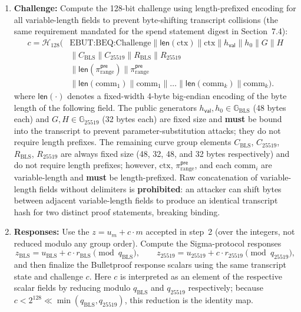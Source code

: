 \documentclass[11pt]{article}
\theoremstyle{definitionstyle}
\theoremstyle{plain}
\begin{document}
\begin{enumerate}[leftmargin=*]
\item \textbf{Challenge:}
  Compute the 128-bit challenge using length-prefixed encoding for all variable-length fields to prevent byte-shifting transcript collisions (the same requirement mandated for the spend statement digest in Section~7.4):
  \[
  \begin{aligned}
  c = \mathcal{H}_{128}\!\bigl(&\text{EBUT:BEQ:Challenge} \parallel \mathsf{len}(\text{ctx}) \parallel \text{ctx} \parallel h_{\mathsf{val}} \parallel h_0 \parallel G \parallel H \\
  &\parallel C_{\text{BLS}} \parallel C_{25519} \parallel R_{\text{BLS}} \parallel R_{25519} \\
  &\parallel \mathsf{len}(\pi_{\text{range}}^{\mathsf{pre}}) \parallel \pi_{\text{range}}^{\mathsf{pre}} \\
  &\parallel \mathsf{len}(\text{comm}_1) \parallel \text{comm}_1 \parallel \dots \parallel \mathsf{len}(\text{comm}_k) \parallel \text{comm}_k\bigr).
  \end{aligned}
  \]
  where $\mathsf{len}(\cdot)$ denotes a fixed-width 4-byte big-endian encoding of the byte length of the following field. The public generators $h_{\mathsf{val}}, h_0 \in \mathbb{G}_{\text{BLS}}$ (48 bytes each) and $G, H \in \mathbb{G}_{25519}$ (32 bytes each) are fixed size and \textbf{must} be bound into the transcript to prevent parameter-substitution attacks; they do not require length prefixes. The remaining curve group elements $C_{\text{BLS}}$, $C_{25519}$, $R_{\text{BLS}}$, $R_{25519}$ are always fixed size (48, 32, 48, and 32 bytes respectively) and do not require length prefixes; however, $\text{ctx}$, $\pi_{\text{range}}^{\mathsf{pre}}$, and each $\text{comm}_i$ are variable-length and \textbf{must} be length-prefixed. Raw concatenation of variable-length fields without delimiters is \textbf{prohibited}: an attacker can shift bytes between adjacent variable-length fields to produce an identical transcript hash for two distinct proof statements, breaking binding.

\item \textbf{Responses:}
  Use the $z = u_m + c \cdot m$ accepted in step~2 (over the integers, not reduced modulo any group order).
  Compute the Sigma-protocol responses
  \[
  z_{\text{BLS}} = u_{\text{BLS}} + c \cdot r_{\text{BLS}} \pmod{q_{\text{BLS}}}, \qquad
  z_{25519} = u_{25519} + c \cdot r_{25519} \pmod{q_{25519}},
  \]
  and then finalize the Bulletproof response scalars using the same transcript state and challenge $c$. Here $c$ is interpreted as an element of the respective scalar fields by reducing modulo $q_{\text{BLS}}$ and $q_{25519}$ respectively; because $c < 2^{128} \ll \min(q_{\text{BLS}}, q_{25519})$, this reduction is the identity map.


\end{enumerate}
\end{document}
